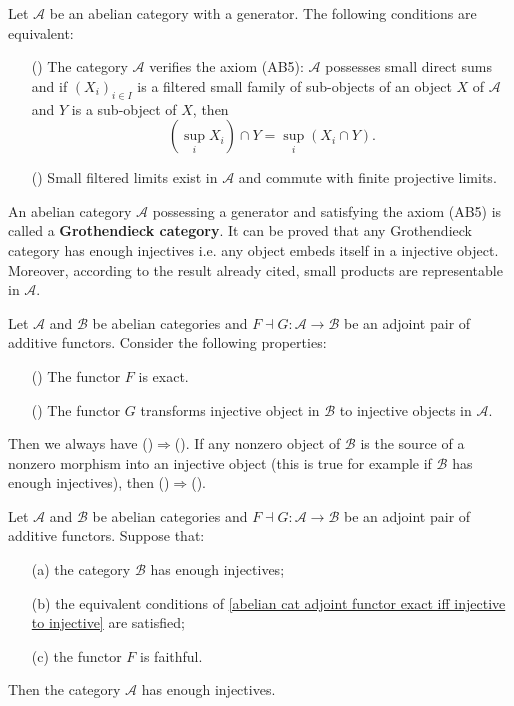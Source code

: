\begin{proposition}\label{abelian cat with generator AB5 iff}
Let $\mathcal{A}$ be an abelian category with a generator. The following conditions are equivalent:
\begin{enumerate}
    \item[(\rmnum{1})] The category $\mathcal{A}$ verifies the axiom (AB5): $\mathcal{A}$ possesses small direct sums and if $(X_i)_{i\in I}$ is a filtered small family of sub-objects of an object $X$ of $\mathcal{A}$ and $Y$ is a sub-object of $X$, then
    \[(\sup_iX_i)\cap Y=\sup_i(X_i\cap Y).\]
    \item[(\rmnum{2})] Small filtered limits exist in $\mathcal{A}$ and commute with finite projective limits.
\end{enumerate}
\end{proposition}

An abelian category $\mathcal{A}$ possessing a generator and satisfying
the axiom (AB5) is called a \textbf{Grothendieck category}. It can be proved that any Grothendieck category has enough injectives i.e. any object embeds itself in a injective object. Moreover, according to the result already cited, small products are representable in $\mathcal{A}$.

\begin{proposition}\label{abelian cat adjoint functor exact iff injective to injective}
Let $\mathcal{A}$ and $\mathcal{B}$ be abelian categories and $F\dashv G:\mathcal{A}\to \mathcal{B}$ be an adjoint pair of additive functors. Consider the following properties:
\begin{enumerate}
    \item[(\rmnum{1})] The functor $F$ is exact.
    \item[(\rmnum{2})] The functor $G$ transforms injective object in $\mathcal{B}$ to injective objects in $\mathcal{A}$.
\end{enumerate}
Then we always have ()$\Rightarrow$(). If any nonzero object of $\mathcal{B}$ is the source of a nonzero morphism into an injective object (this is true for example if $\mathcal{B}$ has enough injectives), then ()$\Rightarrow$().
\end{proposition}

\begin{proposition}\label{abelian cat adjoint functor engouh injective if}
Let $\mathcal{A}$ and $\mathcal{B}$ be abelian categories and $F\dashv G:\mathcal{A}\to \mathcal{B}$ be an adjoint pair of additive functors. Suppose that:
\begin{enumerate}
    \item[(a)] the category $\mathcal{B}$ has enough injectives;
    \item[(b)] the equivalent conditions of \cref{abelian cat adjoint functor exact iff injective to injective} are satisfied;
    \item[(c)] the functor $F$ is faithful. 
\end{enumerate}
Then the category $\mathcal{A}$ has enough injectives.
\end{proposition}

